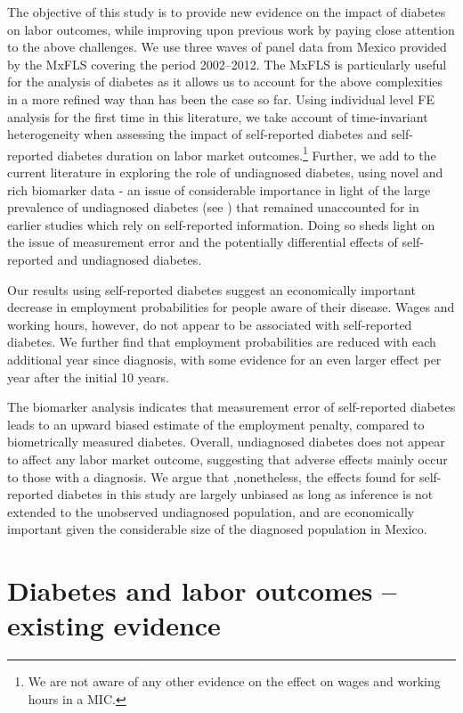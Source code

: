 \documentclass[12pt,english]{article}
\begin{document}
The objective of this study is to provide new evidence on the impact of diabetes on labor outcomes, while improving upon previous work by paying close attention to the above challenges. We use three waves of panel data from Mexico provided by the \ac{MxFLS} covering the period 2002--2012. The \ac{MxFLS} is particularly useful for the analysis of diabetes as it allows us to account for the above complexities in a more refined way than has been the case so far. Using individual level \ac{FE} analysis for the first time in this literature, we take account of time-invariant heterogeneity when assessing the impact of self-reported diabetes and self-reported diabetes duration on labor market outcomes.\footnote{We are not aware of any other evidence on the effect on wages and working hours in a \ac{MIC}.} Further, we add to the current literature in exploring the role of undiagnosed diabetes, using novel and rich biomarker data - an issue of considerable importance in light of the large prevalence of undiagnosed diabetes (see \textcite{Beagley2014}) that remained unaccounted for in earlier studies which rely on self-reported information. Doing so sheds light on the issue of measurement error and the potentially differential effects of self-reported and undiagnosed diabetes. 

Our  results using self-reported diabetes suggest an economically important decrease in employment probabilities for people aware of their disease. Wages and working hours, however, do not appear to be associated with self-reported diabetes. We further find that employment probabilities are reduced with each additional year since diagnosis, with some evidence for an even larger effect per year after the initial 10 years. 

The biomarker analysis indicates that measurement error of self-reported diabetes leads to an upward biased estimate of the employment penalty, compared to biometrically measured diabetes. Overall, undiagnosed diabetes does not appear to affect any labor market outcome, suggesting that adverse effects mainly occur to those with a diagnosis. We argue that ,nonetheless, the effects found for self-reported diabetes in this study are largely unbiased as long as inference is not extended to the unobserved undiagnosed population, and are economically important given the considerable size of the diagnosed population in Mexico.


\section{\label{sec:Labor  outcomes and diabetes literature} Diabetes and labor outcomes -- existing evidence }
\end{document}
